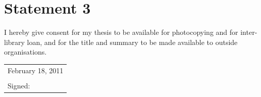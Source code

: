 \documentclass[11pt, a4paper, twoside, openright]{book}
\begin{document}
\section*{Statement 3}

I hereby give consent for my thesis to be available for
photocopying and for inter-library loan, and for the title and summary
to be made available to outside organisations.

\vspace{0.5cm}
\begin{tabular}{l}
February 18, 2011\\
\\
Signed:
\end{tabular}

\clearpage
\thispagestyle{empty}
\mbox{}

\newpage

\tableofcontents


\clearpage





























\end{document}
